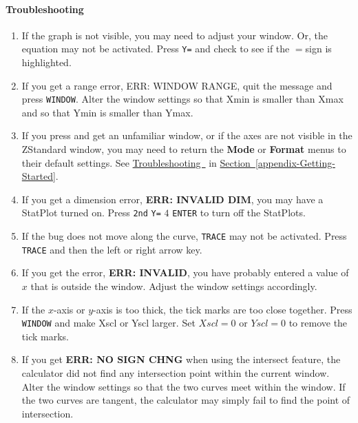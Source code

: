 \documentclass[10pt,]{book}
\newcommand{\terminology}[1]{\textbf{#1}}
\theoremstyle{plain}
\theoremstyle{definition}
\theoremstyle{definition}
\theoremstyle{definition}
\numberwithin{equation}{part}
\begin{document}
\paragraph[{Troubleshooting}]{Troubleshooting}\hypertarget{paragraphs-3}{}
\leavevmode%
\begin{enumerate}[label=*\arabic**]
\item\hypertarget{li-426}{}If the graph is not visible, you may need to adjust your window. Or, the equation may not be activated. Press \lstinline?Y=? and check to see if the \(=\)sign is highlighted.%
\item\hypertarget{li-427}{}If you get a range error, ERR: WINDOW RANGE, quit the message and press \lstinline?WINDOW?. Alter the window settings so that Xmin is smaller than Xmax and so that Ymin is smaller than Ymax.%
\item\hypertarget{li-428}{}If you press and get an unfamiliar window, or if the axes are not visible in the ZStandard window, you may need to return the \terminology{Mode} or \terminology{Format} menus to their default settings. See \hyperlink{troubleshooting}{Troubleshooting~} in \hyperref[appendix-Getting-Started]{Section~\ref{appendix-Getting-Started}}.%
\item\hypertarget{li-429}{}If you get a dimension error, \terminology{ERR: INVALID DIM}, you may have a StatPlot turned on. Press \lstinline?2nd? \lstinline?Y=? \(4\) \lstinline?ENTER? to turn off the StatPlots.%
\item\hypertarget{li-430}{}If the bug does not move along the curve, \lstinline?TRACE? may not be activated. Press \lstinline?TRACE? and then the left or right arrow key.%
\item\hypertarget{li-431}{}If you get the error, \terminology{ERR: INVALID}, you have probably entered a value of \(x\) that is outside the window. Adjust the window settings accordingly.%
\item\hypertarget{li-432}{}If the \(x\)-axis or \(y\)-axis is too thick, the tick marks are too close together. Press \lstinline?WINDOW? and make Xscl or Yscl larger. Set \(Xscl=0\) or \(Yscl =0\) to remove the tick marks.%
\item\hypertarget{li-433}{}If you get \terminology{ERR: NO SIGN CHNG} when using the intersect feature, the calculator did not find any intersection point within the current window. Alter the window settings so that the two curves meet within the window. If the two curves are tangent, the calculator may simply fail to find the point of intersection.%
\end{enumerate}
%
\typeout{************************************************}
\typeout{************************************************}
\end{document}
